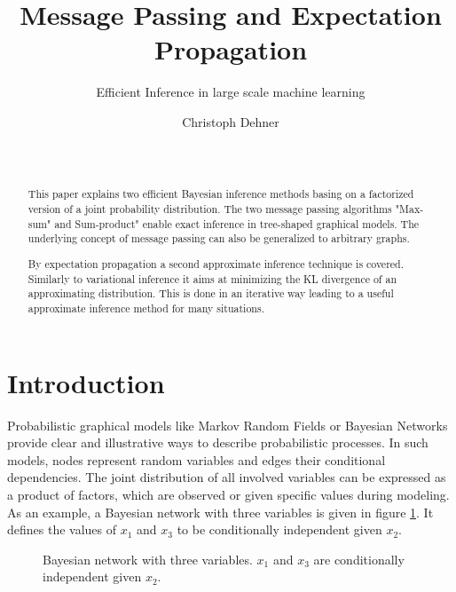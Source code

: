 \documentclass{sigkdd}
\title{Message Passing and Expectation Propagation}
\subtitle{Efficient Inference in large scale machine learning}
\author{
\alignauthor Christoph Dehner \\
\affaddr{Department of Informatics}\\
\affaddr{Technische Universit\"at M\"unchen}\\
\email{dehner@in.tum.de}
}
\begin{document}
\maketitle

\begin{abstract}
This paper explains two efficient Bayesian inference methods basing on a factorized version of a joint probability distribution. The two message passing algorithms "Max-sum" and Sum-product" enable exact inference in tree-shaped graphical models. The underlying concept of message passing can also be generalized to arbitrary graphs.

By expectation propagation a second approximate inference technique is covered. Similarly to variational inference it aims at minimizing the KL divergence of an approximating distribution. This is done in an iterative way leading to a useful approximate inference method for many situations.
\end{abstract}

\section{Introduction}
Probabilistic graphical models like Markov Random Fields or Bayesian Networks provide clear and illustrative ways to describe probabilistic processes. In such models, nodes represent random variables and edges their conditional dependencies. The joint distribution of all involved variables can be expressed as a product of factors, which are observed or given specific values during modeling. As an example, a Bayesian network with three variables is given in figure \ref{fig:BN}. It defines the values of $x_1$ and $x_3$ to be conditionally independent given $x_2$.
\begin{figure}[h]
	\centering
	\caption{Bayesian network with three variables. $x_1$ and $x_3$ are conditionally independent given $x_2$.}\label{fig:BN}
\end{figure}
\end{document}
